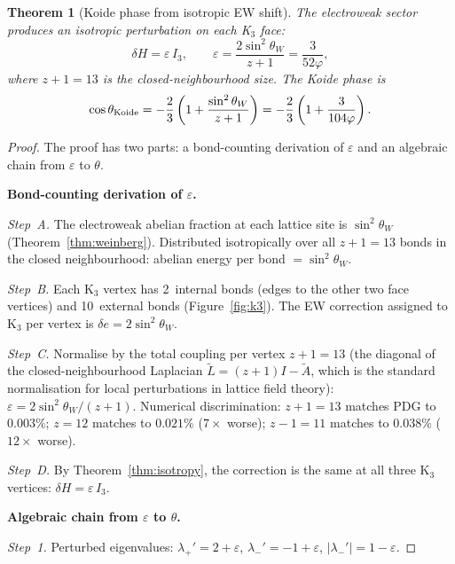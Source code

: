 \documentclass[11pt,letterpaper]{article}
\newtheorem{theorem}{Theorem}[section]
\newcommand{\phig}{\varphi}
\begin{document}
\begin{theorem}[Koide phase from isotropic EW shift]
\label{thm:koide_phase}
The electroweak sector produces an isotropic perturbation on each K$_3$ face:
\begin{equation}
\delta H = \varepsilon \, I_3, \qquad \varepsilon = \frac{2\sin^2\theta_W}{z+1} = \frac{3}{52\phig},
\label{eq:epsilon}
\end{equation}
where $z + 1 = 13$ is the closed-neighbourhood size. The Koide phase is
\begin{equation}
\cos\theta_{\rm Koide} = -\frac{2}{3}\left(1 + \frac{\sin^2\theta_W}{z+1}\right) = -\frac{2}{3}\left(1 + \frac{3}{104\phig}\right).
\label{eq:koide_phase}
\end{equation}
\end{theorem}

\begin{proof}
The proof has two parts: a bond-counting derivation of $\varepsilon$ and an algebraic chain from $\varepsilon$ to $\theta$.

\medskip\noindent\textbf{Bond-counting derivation of $\varepsilon$.}

\noindent\emph{Step~A.} The electroweak abelian fraction at each lattice site is $\sin^2\theta_W$ (Theorem~\ref{thm:weinberg}). Distributed isotropically over all $z+1 = 13$ bonds in the closed neighbourhood: abelian energy per bond $= \sin^2\theta_W$.

\noindent\emph{Step~B.} Each K$_3$ vertex has 2~internal bonds (edges to the other two face vertices) and 10~external bonds (Figure~\ref{fig:k3}). The EW correction assigned to K$_3$ per vertex is $\delta e = 2 \sin^2\theta_W$.

\noindent\emph{Step~C.} Normalise by the total coupling per vertex $z + 1 = 13$ (the diagonal of the closed-neighbourhood Laplacian $\tilde{L} = (z{+}1)I - \tilde{A}$, which is the standard normalisation for local perturbations in lattice field theory): $\varepsilon = 2\sin^2\theta_W/(z{+}1)$. Numerical discrimination: $z{+}1 = 13$ matches PDG to $0.003\%$; $z = 12$ matches to $0.021\%$ ($7\times$ worse); $z{-}1 = 11$ matches to $0.038\%$ ($12\times$ worse).

\noindent\emph{Step~D.} By Theorem~\ref{thm:isotropy}, the correction is the same at all three K$_3$ vertices: $\delta H = \varepsilon \, I_3$.

\medskip\noindent\textbf{Algebraic chain from $\varepsilon$ to $\theta$.}

\noindent\emph{Step~1.} Perturbed eigenvalues: $\lambda_+' = 2 + \varepsilon$, \; $\lambda_-' = -1 + \varepsilon$, \; $|\lambda_-'| = 1 - \varepsilon$.


\end{proof}
\end{document}
